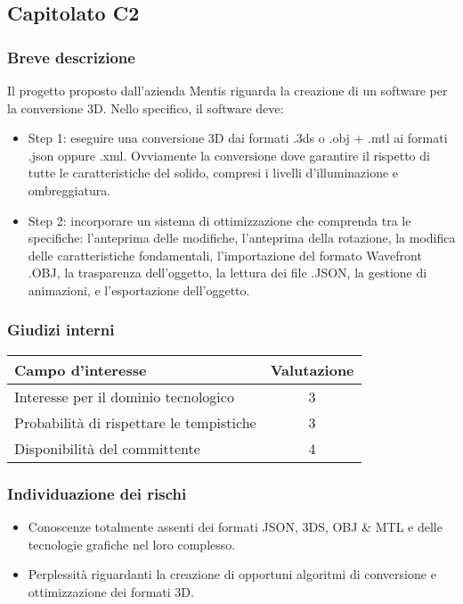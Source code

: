 \subsection{Capitolato C2}
\subsubsection{Breve descrizione}
Il progetto proposto dall'azienda Mentis riguarda la creazione di un software per la conversione 3D. Nello specifico, il software deve:
\begin{itemize}
	\item Step 1: eseguire una conversione 3D dai formati .3ds o .obj + .mtl ai formati .json oppure .xml. Ovviamente la conversione dove garantire il rispetto di tutte le caratteristiche del solido, compresi i livelli d'illuminazione e ombreggiatura.
	\item Step 2: incorporare un sistema di ottimizzazione che comprenda tra le specifiche: l'anteprima delle modifiche, l'anteprima della rotazione, la modifica delle caratteristiche fondamentali, l'importazione del formato Wavefront .OBJ, la trasparenza dell'oggetto, la lettura dei file .JSON, la gestione di animazioni, e l'esportazione dell'oggetto.
\end{itemize}
\subsubsection{Giudizi interni}
\begin{center}
\begin{tabular}{lc}
\toprule
Campo d'interesse & Valutazione\\
\midrule %
Interesse per il dominio tecnologico & 3\\
Probabilità di rispettare le tempistiche & 3\\
Disponibilità del committente & 4\\
\bottomrule
\end{tabular}
\end{center}
\subsubsection{Individuazione dei rischi}
\begin{itemize}
	\item Conoscenze totalmente assenti dei formati JSON, 3DS, OBJ \& MTL e delle tecnologie grafiche nel loro complesso.
	\item Perplessità riguardanti la creazione di opportuni algoritmi di conversione e ottimizzazione dei formati 3D.
\end{itemize}
